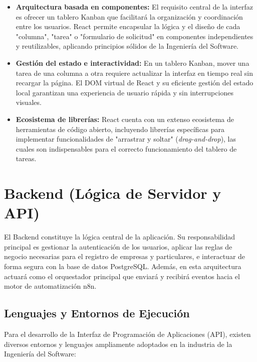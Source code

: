 \documentclass[12pt, a4paper]{book}
\begin{document}
\begin{itemize}
    \item \textbf{Arquitectura basada en componentes:} El requisito central de la interfaz es ofrecer un tablero Kanban que facilitará la organización y coordinación entre los usuarios. React permite encapsular la lógica y el diseño de cada "columna", "tarea" o "formulario de solicitud" en componentes independientes y reutilizables, aplicando principios sólidos de la Ingeniería del Software.
    
    \item \textbf{Gestión del estado e interactividad:} En un tablero Kanban, mover una tarea de una columna a otra requiere actualizar la interfaz en tiempo real sin recargar la página. El DOM virtual de React y su eficiente gestión del estado local garantizan una experiencia de usuario rápida y sin interrupciones visuales.
    
    \item \textbf{Ecosistema de librerías:} React cuenta con un extenso ecosistema de herramientas de código abierto, incluyendo librerías específicas para implementar funcionalidades de "arrastrar y soltar" (\textit{drag-and-drop}), las cuales son indispensables para el correcto funcionamiento del tablero de tareas.
\end{itemize}

\section{Backend (Lógica de Servidor y API)}

El Backend constituye la lógica central de la aplicación. Su responsabilidad principal es gestionar la autenticación de los usuarios, aplicar las reglas de negocio necesarias para el registro de empresas y particulares, e interactuar de forma segura con la base de datos PostgreSQL. Además, en esta arquitectura actuará como el orquestador principal que enviará y recibirá eventos hacia el motor de automatización n8n.

\subsection{Lenguajes y Entornos de Ejecución}

Para el desarrollo de la Interfaz de Programación de Aplicaciones (API), existen diversos entornos y lenguajes ampliamente adoptados en la industria de la Ingeniería del Software:
\end{document}
